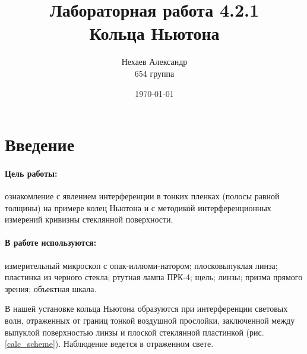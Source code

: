 \documentclass[a4paper, 12pt]{article}
\title{Лабораторная работа 4.2.1\\Кольца Ньютона}
\author{Нехаев Александр\\654 группа}
\date{\today}
\begin{document}
	\maketitle
	\newpage
	\tableofcontents
	\newpage
	\section{Введение}
	\paragraph{Цель работы:} ознакомление с явлением интерференции в тонких пленках (полосы равной толщины) на примере колец Ньютона и с методикой интерференционных измерений кривизны стеклянной поверхности.
	\paragraph{В работе используются:} измерительный микроскоп с опак-иллюми-натором; плосковыпуклая линза; пластинка из черного стекла; ртутная лампа ПРК-4; щель; линзы; призма прямого зрения; объектная шкала.\par
	В нашей установке кольца Ньютона образуются при интерференции световых волн, отраженных от границ тонкой воздушной прослойки, заключенной между выпуклой поверхностью линзы и плоской стеклянной пластинкой (рис. \ref{calc_scheme}). Наблюдение ведется в отраженном свете.\par
	
\end{document}
